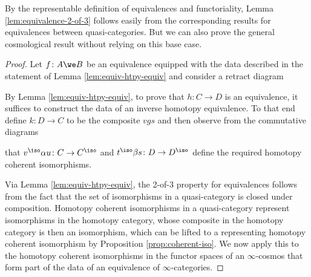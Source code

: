 By the representable definition of equivalences and functoriality, Lemma \ref{lem:equivalence-2-of-3} follows easily from the corresponding results for equivalences between quasi-categories.
  But we can also prove the general cosmological result without relying on this base case.


\begin{proof}
Let $f \colon A \we B$ be an equivalence equipped with the data described in the statement of Lemma \ref{lem:equiv-htpy-equiv} and consider a retract diagram
\begin{center}
\end{center}
By Lemma \ref{lem:equiv-htpy-equiv}, to prove that $h \colon C \to D$ is an equivalence, it suffices to construct the data of an inverse homotopy equivalence. To that end define $k \colon D \to C$ to be the composite $vgs$ and then observe from the commutative diagrams
\begin{center}
\end{center}
that $v^\iso \alpha u \colon C \to C^\iso$ and $t^\iso \beta s \colon D \to D^\iso$ define the required homotopy coherent isomorphisms.

Via Lemma \ref{lem:equiv-htpy-equiv}, the 2-of-3 property for equivalences follows from the fact that the set of  isomorphisms in a quasi-category is closed under composition. Homotopy coherent isomorphisms in a quasi-category represent isomorphisms in the homotopy category, whose composite in the homotopy category is then an isomorphism, which can be lifted to a representing homotopy coherent isomorphism by Proposition \ref{prop:coherent-iso}. We now apply this to the homotopy coherent isomorphisms in the functor spaces of an $\infty$-cosmos that form part of the data of an equivalence of $\infty$-categories.


\end{proof}
